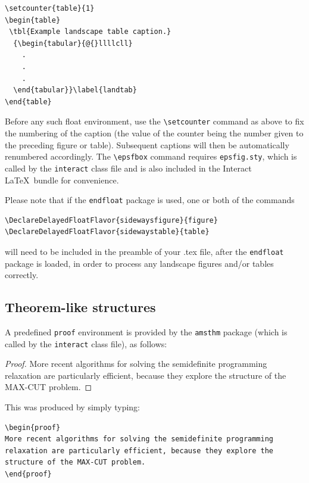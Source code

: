 \documentclass[]{interact}
\theoremstyle{plain}%
\theoremstyle{definition}
\theoremstyle{remark}
\begin{document}
\begin{verbatim}
\setcounter{table}{1}
\begin{table}
 \tbl{Example landscape table caption.}
  {\begin{tabular}{@{}llllcll}
    .
    .
    .
  \end{tabular}}\label{landtab}
\end{table}
\end{verbatim}

Before any such float environment, use the \texttt{\textbackslash{}setcounter} command as above to fix the numbering of the caption (the value of the counter being the number given to the preceding figure or table). Subsequent captions will then be automatically renumbered accordingly. The \texttt{\textbackslash{}epsfbox} command requires \texttt{epsfig.sty}, which is called by the \texttt{interact} class file and is also included in the \textsf{Interact} \LaTeX~bundle for convenience.

Please note that if the \texttt{endfloat} package is used, one or both of the commands

\begin{verbatim}
\DeclareDelayedFloatFlavor{sidewaysfigure}{figure}
\DeclareDelayedFloatFlavor{sidewaystable}{table}
\end{verbatim}

will need to be included in the preamble of your .tex file, after the \texttt{endfloat} package is loaded, in order to process any landscape figures and/or tables correctly.

\hypertarget{theorem-like-structures}{%
\subsection{Theorem-like structures}\label{theorem-like-structures}}

A predefined \texttt{proof} environment is provided by the \texttt{amsthm} package (which is called by the \texttt{interact} class file), as follows:

\begin{proof}
More recent algorithms for solving the semidefinite programming relaxation are particularly efficient, because they explore the structure of the MAX-CUT problem.
\end{proof}

\noindent This was produced by simply typing:

\begin{verbatim}
\begin{proof}
More recent algorithms for solving the semidefinite programming
relaxation are particularly efficient, because they explore the
structure of the MAX-CUT problem.
\end{proof}
\end{verbatim}
\end{document}
